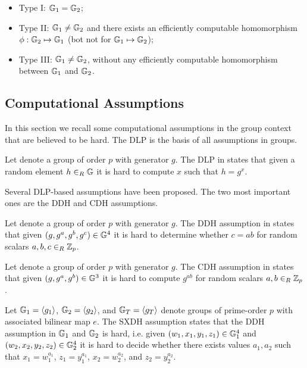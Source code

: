 \begin{itemize}
  \item Type I: $\GG_1 = \GG_2$;
  \item Type II: $\GG_1 \not= \GG_2$ and there exists an efficiently computable homomorphism $\phi: \GG_2 \mapsto \GG_1$ (bot not for $\GG_1 \mapsto \GG_2$);
  \item Type III: $\GG_1 \not= \GG_2$, without any efficiently computable homomorphism between $\GG_1$ and $\GG_2$.
\end{itemize}

\subsection{Computational Assumptions}
In this section we recall some computational assumptions in the group context that are believed to be hard.
The \ac{DLP} is the basis of all assumptions in groups.

\begin{definition}\label{def:dlp}
Let \GG denote a group of order $p$ with generator $g$.
The \ac{DLP} in \GG states that given a random element $h\rin\GG$ it is hard to compute $x$ such that $h=g^x$.
\eod
\end{definition}

\noindent
Several \ac{DLP}-based assumptions have been proposed.
The two most important ones are the \ac{DDH} and \ac{CDH} assumptions.

\begin{definition}\label{def:ddh}
Let \GG denote a group of order $p$ with generator $g$.
The \ac{DDH} assumption in \GG states that given $(g,g^a,g^b,g^c)\in\GG^4$ it is hard to determine whether $c=ab$ for random scalars $a,b,c\rin\ZZ_p$.
\eod
\end{definition}

\begin{definition}\label{def:cdh}
Let \GG denote a group of order $p$ with generator $g$.
The \ac{CDH} assumption in \GG states that given $(g,g^a,g^b)\in\GG^3$ it is hard to compute $g^{ab}$ for random scalars $a,b\rin\ZZ_p$.
\eod
\end{definition}

\begin{definition}\label{def:sxdh}
Let $\GG_1=\genG[1]$, $\GG_2=\genG[2]$, and $\GG_T=\genG[T]$ denote groups of prime-order $p$ with associated bilinear map $e$.
The \ac{SXDH} assumption states that the DDH assumption in $\GG_1$ and $\GG_2$ is hard, i.e. given $(w_1,x_1,y_1,z_1)\in\GG^4_1$ and $(w_2,x_2,y_2,z_2)\in\GG^4_2$ it is hard to decide whether there exists values $a_1,a_2$ such that $x_1=w_1^{a_1}$, $z_1=y_1^{a_1}$, $x_2=w_2^{a_2}$, and $z_2=y_2^{a_2}$.
\eod
\end{definition}

